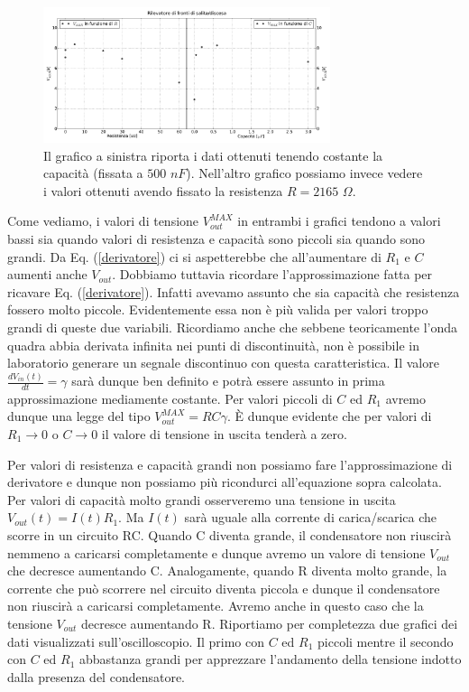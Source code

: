 \begin{figure}[h]
\center
	\includegraphics[width=0.75\textwidth]{dati.pdf}
	\caption{Il grafico a sinistra riporta i dati ottenuti tenendo costante la capacità (fissata a $500\,\, nF$). Nell'altro grafico possiamo invece vedere i valori ottenuti avendo fissato la resistenza $R=2165 \,\, \Omega$.}
	\label{fig:dati}
\end{figure}


Come vediamo, i valori di tensione $V_{out}^{MAX}$ in entrambi i grafici tendono a valori bassi sia quando valori di resistenza e capacità sono piccoli sia quando sono grandi. Da Eq. (\ref{derivatore}) ci si aspetterebbe che all'aumentare di $R_1$ e $C$ aumenti anche $V_{out}$. Dobbiamo tuttavia ricordare l'approssimazione fatta per ricavare Eq. (\ref{derivatore}). Infatti avevamo assunto che sia capacità che resistenza fossero molto piccole. Evidentemente essa non è più valida per valori troppo grandi di queste due variabili. Ricordiamo anche che sebbene teoricamente l'onda quadra abbia derivata infinita nei punti di discontinuità, non è possibile in laboratorio generare un segnale discontinuo con questa caratteristica. Il valore $\frac{dV_{in}(t)}{dt}=\gamma$  sarà dunque ben definito e potrà essere assunto in prima approssimazione mediamente costante. Per valori piccoli di $C$ ed $R_1$ avremo dunque una legge del tipo $V_{out}^{MAX}= RC \gamma$. \`E dunque evidente che per valori di $R_1\rightarrow 0$ o $C\rightarrow 0$ il valore di tensione in uscita tenderà a zero.

Per valori di resistenza e capacità grandi non possiamo fare l'approssimazione di derivatore e dunque non possiamo più ricondurci all'equazione sopra calcolata. Per valori di capacità molto grandi osserveremo una tensione in uscita $V_{out}(t)=I(t) R_1$. Ma $I(t)$ sarà uguale alla corrente di carica/scarica che scorre in un circuito RC. Quando C diventa grande, il condensatore non riuscirà nemmeno a caricarsi completamente e dunque avremo un valore di tensione $V_{out}$ che decresce aumentando C. Analogamente, quando R diventa molto grande, la corrente che può scorrere nel circuito diventa piccola e dunque il condensatore non riuscirà a caricarsi completamente. Avremo anche in questo caso che la tensione $V_{out}$ decresce aumentando R. Riportiamo per completezza due grafici dei dati visualizzati sull'oscilloscopio. Il primo con $C$ ed $R_1$ piccoli mentre il secondo con $C$ ed $R_1$ abbastanza grandi per apprezzare l'andamento della tensione indotto dalla presenza del condensatore. 



